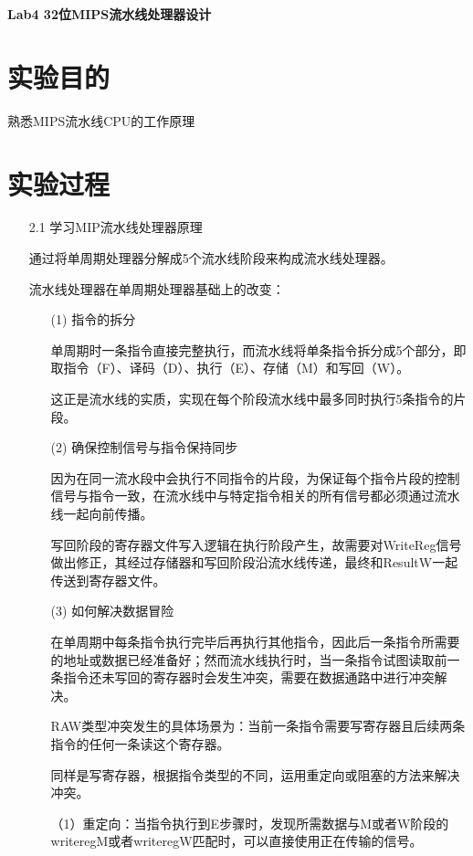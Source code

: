 \documentclass[UTF8]{article}
\begin{document}
	\begin{center}
	\textbf{{\huge Lab4 32位MIPS流水线处理器设计}}
	\end{center}
	\section{实验目的}
	\par 
	熟悉MIPS流水线CPU的工作原理
	\section{实验过程}
	\begin{enumerate}
		\item [2.1] 学习MIP流水线处理器原理
		\par 
		通过将单周期处理器分解成5个流水线阶段来构成流水线处理器。
		
		流水线处理器在单周期处理器基础上的改变：
		\begin{enumerate}
			\item [(1)] 指令的拆分
				\par 
				单周期时一条指令直接完整执行，而流水线将单条指令拆分成5个部分，即取指令（F）、译码（D）、执行（E）、存储（M）和写回（W）。
				
				这正是流水线的实质，实现在每个阶段流水线中最多同时执行5条指令的片段。
			\item [(2)] 确保控制信号与指令保持同步
				\par
				因为在同一流水段中会执行不同指令的片段，为保证每个指令片段的控制信号与指令一致，在流水线中与特定指令相关的所有信号都必须通过流水线一起向前传播。
					
				写回阶段的寄存器文件写入逻辑在执行阶段产生，故需要对WriteReg信号做出修正，其经过存储器和写回阶段沿流水线传递，最终和ResultW一起传送到寄存器文件。
			\item [(3)] 如何解决数据冒险
				\par
				在单周期中每条指令执行完毕后再执行其他指令，因此后一条指令所需要的地址或数据已经准备好；然而流水线执行时，当一条指令试图读取前一条指令还未写回的寄存器时会发生冲突，需要在数据通路中进行冲突解决。
					
				RAW类型冲突发生的具体场景为：当前一条指令需要写寄存器且后续两条指令的任何一条读这个寄存器。
					
				同样是写寄存器，根据指令类型的不同，运用重定向或阻塞的方法来解决冲突。
					
				（1）重定向：当指令执行到E步骤时，发现所需数据与M或者W阶段的writeregM或者writeregW匹配时，可以直接使用正在传输的信号。
					

\end{enumerate}
\end{enumerate}
\end{document}
